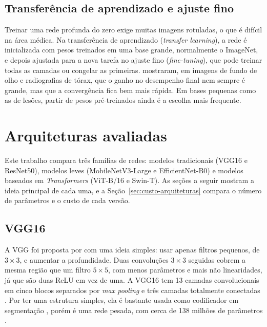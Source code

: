 \subsection{Transferência de aprendizado e ajuste fino}
\label{sec:transferencia}

Treinar uma rede profunda do zero exige muitas imagens rotuladas, o que é difícil na área médica. Na transferência de aprendizado (\textit{transfer learning}), a rede é inicializada com pesos treinados em uma base grande, normalmente o ImageNet, e depois ajustada para a nova tarefa no ajuste fino (\textit{fine-tuning}), que pode treinar todas as camadas ou congelar as primeiras.  mostraram, em imagens de fundo de olho e radiografias de tórax, que o ganho no desempenho final nem sempre é grande, mas que a convergência fica bem mais rápida. Em bases pequenas como as de lesões, partir de pesos pré-treinados ainda é a escolha mais frequente.

\section{Arquiteturas avaliadas}
\label{sec:ft-arquiteturas}

Este trabalho compara três famílias de redes: modelos tradicionais (VGG16 e ResNet50), modelos leves (MobileNetV3-Large e EfficientNet-B0) e modelos baseados em \textit{Transformers} (ViT-B/16 e Swin-T). As seções a seguir mostram a ideia principal de cada uma, e a Seção~\ref{sec:custo-arquiteturas} compara o número de parâmetros e o custo de cada versão.

\subsection{VGG16}
\label{sec:vgg}

A VGG foi proposta por  com uma ideia simples: usar apenas filtros pequenos, de $3 \times 3$, e aumentar a profundidade. Duas convoluções $3 \times 3$ seguidas cobrem a mesma região que um filtro $5 \times 5$, com menos parâmetros e mais não linearidades, já que são duas ReLU em vez de uma. A VGG16 tem 13 camadas convolucionais em cinco blocos separados por \textit{max pooling} e três camadas totalmente conectadas \cite{simonyan2015vgg}. Por ter uma estrutura simples, ela é bastante usada como codificador em segmentação \cite{iglovikov2018ternausnet}, porém é uma rede pesada, com cerca de 138 milhões de parâmetros \cite{simonyan2015vgg}.

